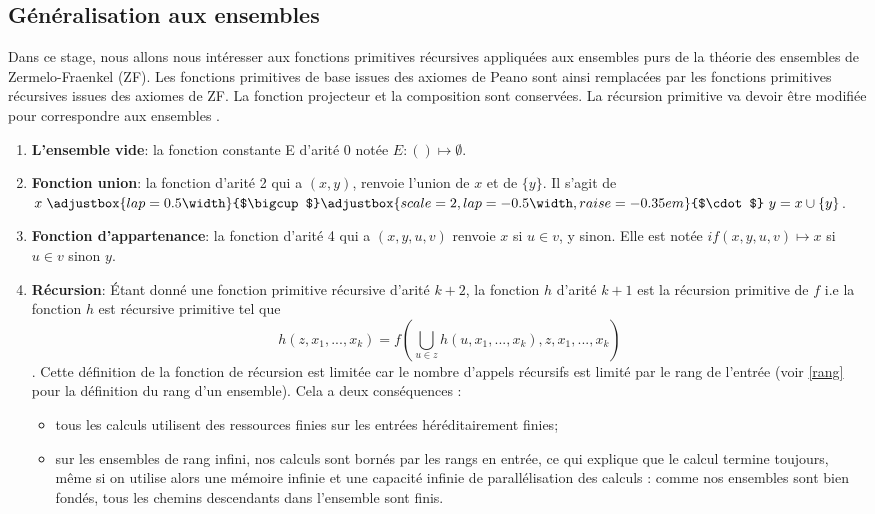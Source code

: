 \documentclass[a4paper, 11pt]{article}
\begin{document}
\subsection{Généralisation aux ensembles}

Dans ce stage, nous allons nous intéresser aux fonctions primitives récursives
appliquées aux ensembles purs de la théorie des ensembles de Zermelo-Fraenkel (ZF).
Les fonctions primitives de base issues des axiomes de Peano sont ainsi
remplacées par les fonctions primitives récursives issues des axiomes de ZF.
La fonction projecteur et la composition sont conservées. La récursion primitive
va devoir être modifiée pour correspondre aux ensembles \cite{jensen1971primitive}. 

\def\unionplus{\ensuremath{\kern-0.4pt\adjustbox{lap=0.5\width}{$\bigcup$}\adjustbox{scale=2,lap=-0.5\width, raise=-0.35em}{$\cdot$}}}
\def\ifthenelse{\ensuremath{\kern-0.4pt\adjustbox{lap=0.5\width}{$?$}\adjustbox{scale=1,lap=-0.1\width}{$\in$}}}

\begin{enumerate}
    \item \textbf{L'ensemble vide}: la fonction constante E d'arité 0 
    notée $E: () \mapsto \emptyset$.
    \item \textbf{Fonction union}: la fonction d'arité 2 qui a $(x, y)$, renvoie 
    l'union de $x$ et de $\{y\}$. Il s'agit de $x \ \unionplus \ y = x \cup \{y\}$.
    \item \textbf{Fonction d'appartenance}: la fonction d'arité 4 qui a $(x, y, u, v)$
    renvoie $x$ si $u \in v$, y sinon. Elle est notée $if(x, y, u, v) \mapsto x$
    si $u \in v$ sinon $y$.
    \item \textbf{Récursion}: Étant donné une fonction
    primitive récursive d'arité $k+2$, la fonction $h$ d'arité $k+1$ est la 
    récursion primitive de $f$ i.e la fonction $h$ est récursive primitive tel que
    \[h(z, x_1, ..., x_k) = f(\bigcup_{u \in z} h(u, x_1, ..., x_k), z, x_1, ..., x_k)\].
    Cette définition de la fonction de récursion est limitée car le nombre d'appels récursifs est
    limité par le rang de l'entrée (voir \ref{rang} pour la définition du rang d'un ensemble).
    Cela a deux conséquences : 
    \begin{itemize}
        \item tous les calculs utilisent des ressources finies sur les entrées héréditairement finies;
        \item sur les ensembles de rang infini, nos calculs sont bornés par les rangs en entrée, 
        ce qui explique que le calcul termine toujours, même si on utilise alors une mémoire infinie 
        et une capacité infinie de parallélisation des calculs : 
        comme nos ensembles sont bien fondés, tous les chemins descendants dans l’ensemble sont finis.
    \end{itemize}

\end{enumerate}
\end{document}
